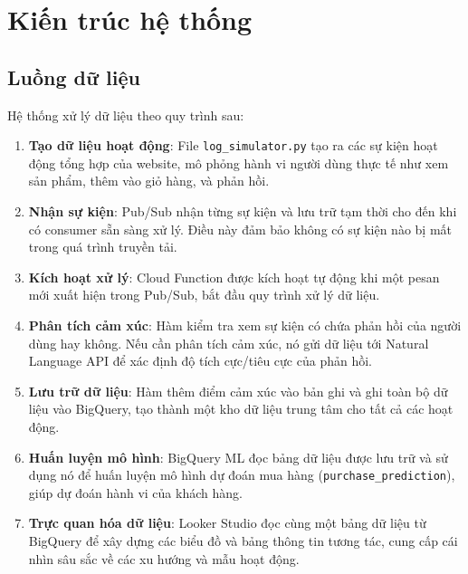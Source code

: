 \section{Kiến trúc hệ thống}

\subsection{Luồng dữ liệu}

Hệ thống xử lý dữ liệu theo quy trình sau:

\begin{enumerate}
    \item \textbf{Tạo dữ liệu hoạt động}: File \texttt{log\_simulator.py} tạo ra các sự kiện hoạt động tổng hợp của website, mô phỏng hành vi người dùng thực tế như xem sản phẩm, thêm vào giỏ hàng, và phản hồi.
    
    \item \textbf{Nhận sự kiện}: Pub/Sub nhận từng sự kiện và lưu trữ tạm thời cho đến khi có consumer sẵn sàng xử lý. Điều này đảm bảo không có sự kiện nào bị mất trong quá trình truyền tải.
    
    \item \textbf{Kích hoạt xử lý}: Cloud Function được kích hoạt tự động khi một pesan mới xuất hiện trong Pub/Sub, bắt đầu quy trình xử lý dữ liệu.
    
    \item \textbf{Phân tích cảm xúc}: Hàm kiểm tra xem sự kiện có chứa phản hồi của người dùng hay không. Nếu cần phân tích cảm xúc, nó gửi dữ liệu tới Natural Language API để xác định độ tích cực/tiêu cực của phản hồi.
    
    \item \textbf{Lưu trữ dữ liệu}: Hàm thêm điểm cảm xúc vào bản ghi và ghi toàn bộ dữ liệu vào BigQuery, tạo thành một kho dữ liệu trung tâm cho tất cả các hoạt động.
    
    \item \textbf{Huấn luyện mô hình}: BigQuery ML đọc bảng dữ liệu được lưu trữ và sử dụng nó để huấn luyện mô hình dự đoán mua hàng (\texttt{purchase\_prediction}), giúp dự đoán hành vi của khách hàng.
    
    \item \textbf{Trực quan hóa dữ liệu}: Looker Studio đọc cùng một bảng dữ liệu từ BigQuery để xây dựng các biểu đồ và bảng thông tin tương tác, cung cấp cái nhìn sâu sắc về các xu hướng và mẫu hoạt động.
\end{enumerate}

